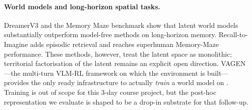 \paragraph{World models and long-horizon spatial tasks.}
DreamerV3 \citep{hafner2023dreamerv3} and the Memory Maze benchmark
\citep{pasukonis2023memorymaze} show that latent world models
substantially outperform model-free methods on long-horizon memory.
Recall-to-Imagine \citep{r2i2024} adds episodic retrieval and reaches
superhuman Memory-Maze performance. These methods, however, treat the
latent space as monolithic; territorial factorisation of the latent
remains an explicit open direction. VAGEN \citep{wang2025vagen}---the
multi-turn VLM-RL framework on which the \tos environment is built---
provides the only ready infrastructure to actually \emph{train} a
world model on \tos. Training is out of scope for this 3-day course
project, but the post-hoc \tb representation we evaluate is shaped to
be a drop-in substrate for that follow-up.
